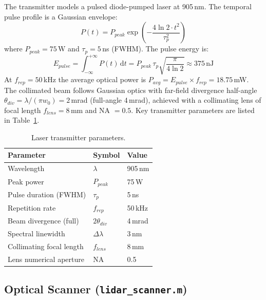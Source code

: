 \documentclass[12pt,a4paper]{article}
\begin{document}
The transmitter models a pulsed diode-pumped laser at 905\,nm.  The temporal pulse
profile is a Gaussian envelope:
\begin{equation}
    P(t) = P_{peak}\exp\!\left(-\frac{4\ln 2\cdot t^2}{\tau_p^2}\right)
    \label{eq:pulse}
\end{equation}
where $P_{peak} = 75$\,W and $\tau_p = 5$\,ns (FWHM).  The pulse energy is:
\begin{equation}
    E_{pulse} = \int_{-\infty}^{+\infty} P(t)\,\mathrm{d}t
    = P_{peak}\,\tau_p\sqrt{\frac{\pi}{4\ln 2}} \approx 375\,\mathrm{nJ}
\end{equation}
At $f_{rep} = 50$\,kHz the average optical power is $P_{avg} = E_{pulse}\times f_{rep}
= 18.75$\,mW.  The collimated beam follows Gaussian optics with far-field divergence
half-angle $\theta_{div} = \lambda/(\pi w_0) = 2$\,mrad (full-angle 4\,mrad),
achieved with a collimating lens of focal length $f_{lens} = 8$\,mm and NA $= 0.5$.
Key transmitter parameters are listed in Table~\ref{tab:tx}.

\begin{table}[H]
\centering
\caption{Laser transmitter parameters.}
\label{tab:tx}
\begin{tabular}{lll}
\toprule
\textbf{Parameter} & \textbf{Symbol} & \textbf{Value} \\
\midrule
Wavelength              & $\lambda$      & 905\,nm \\
Peak power              & $P_{peak}$     & 75\,W \\
Pulse duration (FWHM)   & $\tau_p$       & 5\,ns \\
Repetition rate         & $f_{rep}$      & 50\,kHz \\
Beam divergence (full)  & $2\theta_{div}$& 4\,mrad \\
Spectral linewidth      & $\Delta\lambda$& 3\,nm \\
Collimating focal length& $f_{lens}$     & 8\,mm \\
Lens numerical aperture & NA             & 0.5 \\
\bottomrule
\end{tabular}
\end{table}

\subsection{Optical Scanner (\texttt{lidar\_scanner.m})}
\end{document}
